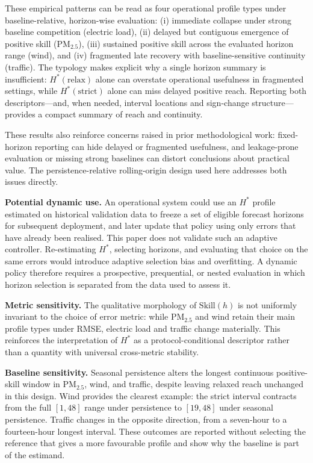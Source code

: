 \documentclass[pdflatex]{sn-jnl}
\begin{document}
These empirical patterns can be read as four operational profile types under baseline-relative, horizon-wise evaluation: (i) immediate collapse under strong baseline competition (electric load), (ii) delayed but contiguous emergence of positive skill (PM$_{2.5}$), (iii) sustained positive skill across the evaluated horizon range (wind), and (iv) fragmented late recovery with baseline-sensitive continuity (traffic). The typology makes explicit why a single horizon summary is insufficient: $H^*(\mathrm{relax})$ alone can overstate operational usefulness in fragmented settings, while $H^*(\mathrm{strict})$ alone can miss delayed positive reach. Reporting both descriptors—and, when needed, interval locations and sign-change structure—provides a compact summary of reach and continuity.

These results also reinforce concerns raised in prior methodological work: fixed-horizon reporting can hide delayed or fragmented usefulness, and leakage-prone evaluation or missing strong baselines can distort conclusions about practical value. The persistence-relative rolling-origin design used here addresses both issues directly.

\textbf{Potential dynamic use.} An operational system could use an $H^*$
profile estimated on historical validation data to freeze a set of eligible
forecast horizons for subsequent deployment, and later update that policy
using only errors that have already been realised. This paper does not
validate such an adaptive controller. Re-estimating $H^*$, selecting horizons,
and evaluating that choice on the same errors would introduce adaptive
selection bias and overfitting. A dynamic policy therefore requires a
prospective, prequential, or nested evaluation in which horizon selection is
separated from the data used to assess it.

\textbf{Metric sensitivity.} The qualitative morphology of $\mathrm{Skill}(h)$ is not uniformly invariant to the choice of error metric: while PM$_{2.5}$ and wind retain their main profile types under RMSE, electric load and traffic change materially. This reinforces the interpretation of $H^*$ as a protocol-conditional descriptor rather than a quantity with universal cross-metric stability.

\textbf{Baseline sensitivity.} Seasonal persistence alters the longest
continuous positive-skill window in PM$_{2.5}$, wind, and traffic, despite
leaving relaxed reach unchanged in this design. Wind provides the clearest
example: the strict interval contracts from the full $[1,48]$ range under
persistence to $[19,48]$ under seasonal persistence. Traffic changes in the
opposite direction, from a seven-hour to a fourteen-hour longest interval.
These outcomes are reported without selecting the reference that gives a more
favourable profile and show why the baseline is part of the estimand.
\end{document}
